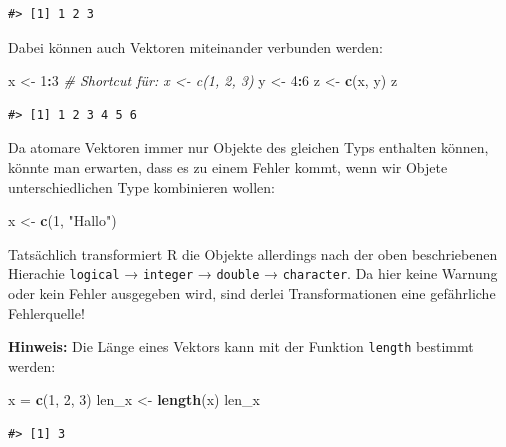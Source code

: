 \documentclass[]{book}
\newenvironment{Shaded}{\begin{snugshade}}{\end{snugshade}}
\newcommand{\KeywordTok}[1]{\textcolor[rgb]{0.13,0.29,0.53}{\textbf{#1}}}
\newcommand{\DecValTok}[1]{\textcolor[rgb]{0.00,0.00,0.81}{#1}}
\newcommand{\StringTok}[1]{\textcolor[rgb]{0.31,0.60,0.02}{#1}}
\newcommand{\CommentTok}[1]{\textcolor[rgb]{0.56,0.35,0.01}{\textit{#1}}}
\newcommand{\OperatorTok}[1]{\textcolor[rgb]{0.81,0.36,0.00}{\textbf{#1}}}
\newcommand{\NormalTok}[1]{#1}
\begin{document}
\begin{verbatim}
#> [1] 1 2 3
\end{verbatim}

Dabei können auch Vektoren miteinander verbunden werden:

\begin{Shaded}
\begin{Highlighting}[]
\NormalTok{x <-}\StringTok{ }\DecValTok{1}\OperatorTok{:}\DecValTok{3} \CommentTok{# Shortcut für: x <- c(1, 2, 3)}
\NormalTok{y <-}\StringTok{ }\DecValTok{4}\OperatorTok{:}\DecValTok{6}
\NormalTok{z <-}\StringTok{ }\KeywordTok{c}\NormalTok{(x, y)}
\NormalTok{z}
\end{Highlighting}
\end{Shaded}

\begin{verbatim}
#> [1] 1 2 3 4 5 6
\end{verbatim}

Da atomare Vektoren immer nur Objekte des gleichen Typs enthalten
können, könnte man erwarten, dass es zu einem Fehler kommt, wenn wir
Objete unterschiedlichen Type kombinieren wollen:

\begin{Shaded}
\begin{Highlighting}[]
\NormalTok{x <-}\StringTok{ }\KeywordTok{c}\NormalTok{(}\DecValTok{1}\NormalTok{, }\StringTok{"Hallo"}\NormalTok{)}
\end{Highlighting}
\end{Shaded}

Tatsächlich transformiert R die Objekte allerdings nach der oben
beschriebenen Hierachie \texttt{logical} → \texttt{integer} →
\texttt{double} → \texttt{character}. Da hier keine Warnung oder kein
Fehler ausgegeben wird, sind derlei Transformationen eine gefährliche
Fehlerquelle!

\textbf{Hinweis:} Die Länge eines Vektors kann mit der Funktion
\texttt{length} bestimmt werden:

\begin{Shaded}
\begin{Highlighting}[]
\NormalTok{x =}\StringTok{  }\KeywordTok{c}\NormalTok{(}\DecValTok{1}\NormalTok{, }\DecValTok{2}\NormalTok{, }\DecValTok{3}\NormalTok{)}
\NormalTok{len_x <-}\StringTok{ }\KeywordTok{length}\NormalTok{(x)}
\NormalTok{len_x}
\end{Highlighting}
\end{Shaded}

\begin{verbatim}
#> [1] 3
\end{verbatim}
\end{document}
